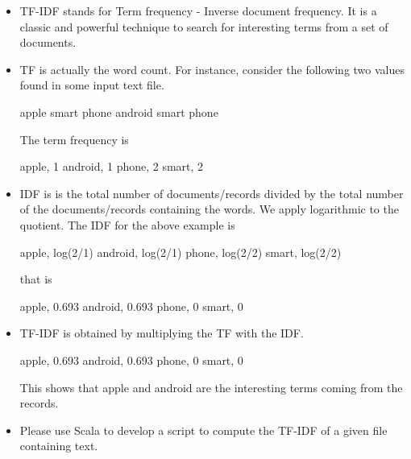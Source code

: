 \documentclass[10pt]{article}
\begin{document}
\begin{itemize}
 \item TF-IDF stands for Term frequency - Inverse document
   frequency. It is a classic and powerful technique to search for
   interesting terms from a set of documents.
 \item TF is actually the word count. For instance, consider the
   following two values found in some input text file.
   \begin{code}
      apple smart phone
      android smart phone
   \end{code}
   The term frequency is 
   \begin{code}
     apple, 1
     android, 1
     phone, 2
     smart, 2
   \end{code}
 \item IDF is is the total number of documents/records divided by the
   total number of the documents/records containing the words. We
   apply logarithmic to the quotient.
  The IDF for the above example is 
 \begin{code}
    apple, log(2/1) 
    android, log(2/1)
    phone, log(2/2)
    smart, log(2/2) 
  \end{code}
   that is 
 \begin{code}
    apple, 0.693
    android, 0.693
    phone, 0
    smart, 0
  \end{code}
  \item TF-IDF is obtained by multiplying the TF with the IDF.
 \begin{code}
    apple, 0.693
    android, 0.693
    phone, 0
    smart, 0
  \end{code}
  This shows that apple and android are the interesting terms coming
  from the records.
 \item Please use Scala to develop a script to compute the
   TF-IDF of a given file containing text.
\end{itemize}
\end{document}
